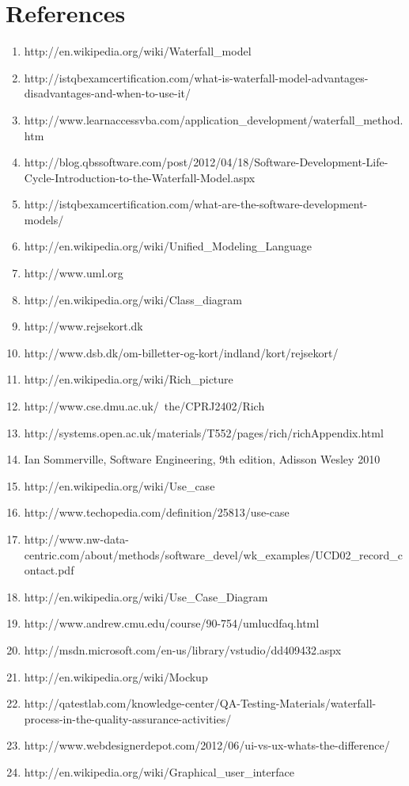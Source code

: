 \section*{References}

\begin{enumerate}
\item http://en.wikipedia.org/wiki/Waterfall_model
\item http://istqbexamcertification.com/what-is-waterfall-model-advantages-disadvantages-and-when-to-use-it/
\item http://www.learnaccessvba.com/application_development/waterfall_method.htm
\item http://blog.qbssoftware.com/post/2012/04/18/Software-Development-Life-Cycle-Introduction-to-the-Waterfall-Model.aspx
\item http://istqbexamcertification.com/what-are-the-software-development-models/
\item http://en.wikipedia.org/wiki/Unified_Modeling_Language
\item http://www.uml.org
\item http://en.wikipedia.org/wiki/Class_diagram
\item http://www.rejsekort.dk
\item http://www.dsb.dk/om-billetter-og-kort/indland/kort/rejsekort/
\item http://en.wikipedia.org/wiki/Rich_picture
\item http://www.cse.dmu.ac.uk/~the/CPRJ2402/Rich%
\item http://systems.open.ac.uk/materials/T552/pages/rich/richAppendix.html
\item Ian Sommerville, Software Engineering, 9th edition, Adisson Wesley 2010
\item http://en.wikipedia.org/wiki/Use_case
\item http://www.techopedia.com/definition/25813/use-case
\item http://www.nw-data-centric.com/about/methods/software_devel/wk_examples/UCD02_record_contact.pdf
\item http://en.wikipedia.org/wiki/Use_Case_Diagram
\item http://www.andrew.cmu.edu/course/90-754/umlucdfaq.html
\item http://msdn.microsoft.com/en-us/library/vstudio/dd409432.aspx
\item http://en.wikipedia.org/wiki/Mockup
\item http://qatestlab.com/knowledge-center/QA-Testing-Materials/waterfall-process-in-the-quality-assurance-activities/
\item http://www.webdesignerdepot.com/2012/06/ui-vs-ux-whats-the-difference/
\item http://en.wikipedia.org/wiki/Graphical_user_interface
\end{enumerate}